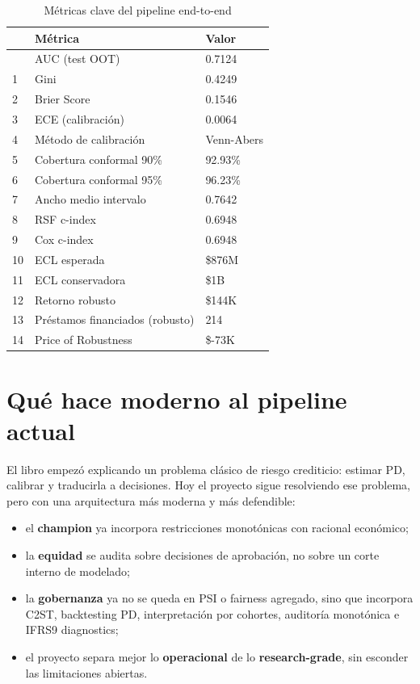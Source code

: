 \documentclass[
  spanish,
  11pt,
  letterpaper,
]{scrbook}
\providecommand{\tightlist}{%
  \setlength{\itemsep}{0pt}\setlength{\parskip}{0pt}}
\theoremstyle{plain}
\theoremstyle{remark}
\begin{document}
{

\begin{longtable}[]{@{}lll@{}}

\caption{\label{tbl-kpis}Métricas clave del pipeline end-to-end}

\tabularnewline

\toprule\noalign{}
& Métrica & Valor \\
\midrule\noalign{}
\endhead
\bottomrule\noalign{}
\endlastfoot
0 & AUC (test OOT) & 0.7124 \\
1 & Gini & 0.4249 \\
2 & Brier Score & 0.1546 \\
3 & ECE (calibración) & 0.0064 \\
4 & Método de calibración & Venn-Abers \\
5 & Cobertura conformal 90\% & 92.93\% \\
6 & Cobertura conformal 95\% & 96.23\% \\
7 & Ancho medio intervalo & 0.7642 \\
8 & RSF c-index & 0.6948 \\
9 & Cox c-index & 0.6948 \\
10 & ECL esperada & \$876M \\
11 & ECL conservadora & \$1B \\
12 & Retorno robusto & \$144K \\
13 & Préstamos financiados (robusto) & 214 \\
14 & Price of Robustness & \$-73K \\

\end{longtable}

}

\section{Qué hace moderno al pipeline
actual}\label{quuxe9-hace-moderno-al-pipeline-actual}

El libro empezó explicando un problema clásico de riesgo crediticio:
estimar PD, calibrar y traducirla a decisiones. Hoy el proyecto sigue
resolviendo ese problema, pero con una arquitectura más moderna y más
defendible:

\begin{itemize}
\tightlist
\item
  el \textbf{champion} ya incorpora restricciones monotónicas con
  racional económico;
\item
  la \textbf{equidad} se audita sobre decisiones de aprobación, no sobre
  un corte interno de modelado;
\item
  la \textbf{gobernanza} ya no se queda en PSI o fairness agregado, sino
  que incorpora C2ST, backtesting PD, interpretación por cohortes,
  auditoría monotónica e IFRS9 diagnostics;
\item
  el proyecto separa mejor lo \textbf{operacional} de lo
  \textbf{research-grade}, sin esconder las limitaciones abiertas.
\end{itemize}
\end{document}
